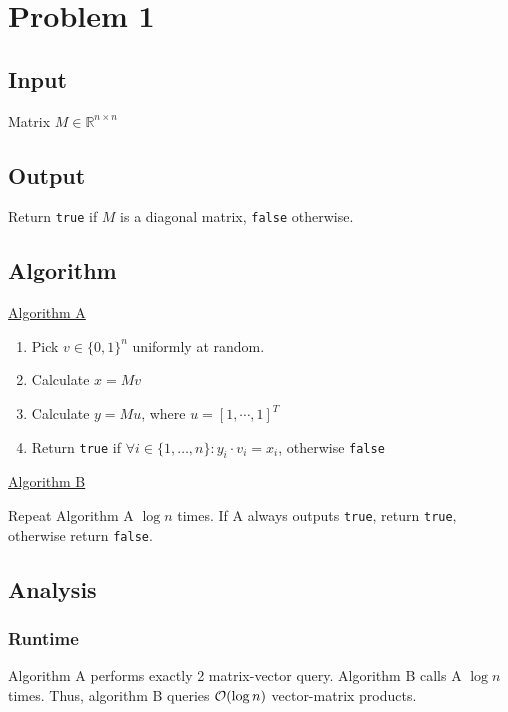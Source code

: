 \section*{Problem 1}

\subsection*{Input}

Matrix $M \in \mathbb{R}^{n \times n}$

\subsection*{Output}

Return \texttt{true} if $M$ is a diagonal matrix, \texttt{false} otherwise.

\subsection*{Algorithm}

\underline{Algorithm A}

\begin{enumerate}
    \item Pick $v \in \{0,1\}^n$ uniformly at random.
    \item Calculate $x = Mv$
    \item Calculate $y = Mu$, where $u = [1,\cdots,1]^T$
    \item Return \texttt{true} if $\forall i \in \{1,\dots,n\}: y_i \cdot v_i = x_i$, otherwise \texttt{false}
\end{enumerate}

\underline{Algorithm B}

Repeat Algorithm A $\operatorname{log} n$ times. If A always outputs \texttt{true}, return \texttt{true}, otherwise return \texttt{false}.

\subsection*{Analysis}

\subsubsection*{Runtime}

Algorithm A performs exactly 2 matrix-vector query. Algorithm B calls A $\operatorname{log} n$ times. Thus, algorithm B queries $\mathcal{O}(\operatorname{log} n)$ vector-matrix products.

